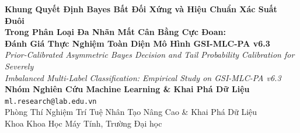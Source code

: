 \documentclass[10pt,a4paper,twoside]{article}
\begin{document}
\thispagestyle{firstpage}

\begin{center}
    {\LARGE\bfseries Khung Quyết Định Bayes Bất Đối Xứng và Hiệu Chuẩn Xác Suất Đuôi\\ Trong Phân Loại Đa Nhãn Mất Cân Bằng Cực Đoan:\\[0.3em] Đánh Giá Thực Nghiệm Toàn Diện Mô Hình GSI-MLC-PA v6.3}\\[0.6em]
    {\large\textit{Prior-Calibrated Asymmetric Bayes Decision and Tail Probability Calibration for Severely\\ Imbalanced Multi-Label Classification: Empirical Study on GSI-MLC-PA v6.3}}\\[0.9em]
    {\textbf{Nhóm Nghiên Cứu Machine Learning \& Khai Phá Dữ Liệu}}\\[0.2em]
    {\texttt{ml.research@lab.edu.vn}}\\[0.2em]
    {\small Phòng Thí Nghiệm Trí Tuệ Nhân Tạo Nâng Cao \& Khai Phá Dữ Liệu}\\[0.1em]
    {\small Khoa Khoa Học Máy Tính, Trường Đại học}\\[0.8em]
\end{center}
\end{document}
